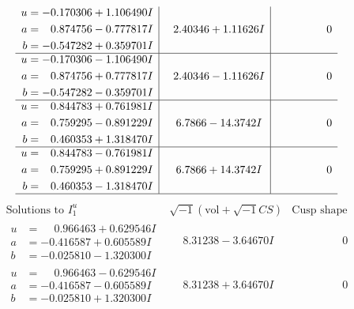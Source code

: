 \documentclass[1p]{elsarticle_modified}
\theoremstyle{definition}
\newcommand{\I}{\sqrt{-1}}
\begin{document}
$$\begin{array}{c|c|c}
\begin{aligned}
u &= -0.170306 + 1.106490 I \\
a &= \phantom{-}0.874756 - 0.777817 I \\
b &= -0.547282 + 0.359701 I\end{aligned}
 & \phantom{-}2.40346 + 1.11626 I & \phantom{-0.000000 } 0 \\ \hline\begin{aligned}
u &= -0.170306 - 1.106490 I \\
a &= \phantom{-}0.874756 + 0.777817 I \\
b &= -0.547282 - 0.359701 I\end{aligned}
 & \phantom{-}2.40346 - 1.11626 I & \phantom{-0.000000 } 0 \\ \hline\begin{aligned}
u &= \phantom{-}0.844783 + 0.761981 I \\
a &= \phantom{-}0.759295 - 0.891229 I \\
b &= \phantom{-}0.460353 + 1.318470 I\end{aligned}
 & \phantom{-}6.7866 - 14.3742 I & \phantom{-0.000000 } 0 \\ \hline\begin{aligned}
u &= \phantom{-}0.844783 - 0.761981 I \\
a &= \phantom{-}0.759295 + 0.891229 I \\
b &= \phantom{-}0.460353 - 1.318470 I\end{aligned}
 & \phantom{-}6.7866 + 14.3742 I & \phantom{-0.000000 } 0\\
 \hline 
 \end{array}$$\newpage$$\begin{array}{c|c|c}  
\text{Solutions to }I^u_{1}& \I (\text{vol} + \sqrt{-1}CS) & \text{Cusp shape}\\
 \hline 
\begin{aligned}
u &= \phantom{-}0.966463 + 0.629546 I \\
a &= -0.416587 + 0.605589 I \\
b &= -0.025810 - 1.320300 I\end{aligned}
 & \phantom{-}8.31238 - 3.64670 I & \phantom{-0.000000 } 0 \\ \hline\begin{aligned}
u &= \phantom{-}0.966463 - 0.629546 I \\
a &= -0.416587 - 0.605589 I \\
b &= -0.025810 + 1.320300 I\end{aligned}
 & \phantom{-}8.31238 + 3.64670 I & \phantom{-0.000000 } 0 \\ \hline\begin{aligned}

\end{aligned}
\end{array}$$
\end{document}
